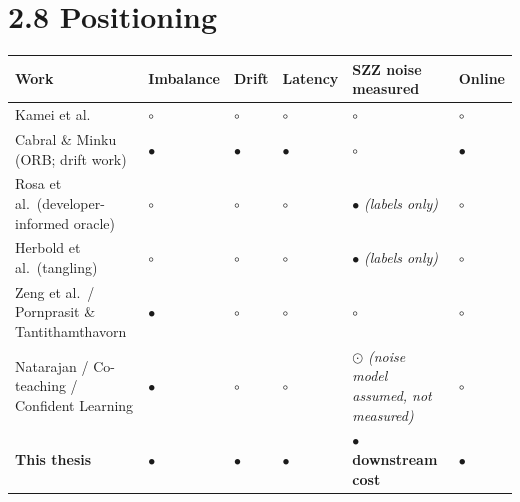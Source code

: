 \section{2.8 Positioning}\label{positioning}

\begin{longtable}[]{@{}
  >{\raggedright\arraybackslash}p{}
  >{\raggedright\arraybackslash}p{}
  >{\raggedright\arraybackslash}p{}
  >{\raggedright\arraybackslash}p{}
  >{\raggedright\arraybackslash}p{}
  >{\raggedright\arraybackslash}p{}@{}}
\toprule\noalign{}
\begin{minipage}[b]{\linewidth}\raggedright
Work
\end{minipage} & \begin{minipage}[b]{\linewidth}\raggedright
Imbalance
\end{minipage} & \begin{minipage}[b]{\linewidth}\raggedright
Drift
\end{minipage} & \begin{minipage}[b]{\linewidth}\raggedright
Latency
\end{minipage} & \begin{minipage}[b]{\linewidth}\raggedright
SZZ noise \textbf{measured}
\end{minipage} & \begin{minipage}[b]{\linewidth}\raggedright
Online
\end{minipage} \\
\midrule\noalign{}
\endhead
\bottomrule\noalign{}
\endlastfoot
Kamei et al. & \ensuremath{\circ} & \ensuremath{\circ} & \ensuremath{\circ} & \ensuremath{\circ} & \ensuremath{\circ} \\
Cabral \& Minku (ORB; drift work) & \ensuremath{\bullet} & \ensuremath{\bullet} & \ensuremath{\bullet} & \ensuremath{\circ} & \ensuremath{\bullet} \\
Rosa et al.~(developer-informed oracle) & \ensuremath{\circ} & \ensuremath{\circ} & \ensuremath{\circ} & \ensuremath{\bullet} \emph{(labels
only)} & \ensuremath{\circ} \\
Herbold et al.~(tangling) & \ensuremath{\circ} & \ensuremath{\circ} & \ensuremath{\circ} & \ensuremath{\bullet} \emph{(labels only)} & \ensuremath{\circ} \\
Zeng et al.~/ Pornprasit \& Tantithamthavorn & \ensuremath{\bullet} & \ensuremath{\circ} & \ensuremath{\circ} & \ensuremath{\circ} & \ensuremath{\circ} \\
Natarajan / Co-teaching / Confident Learning & \ensuremath{\bullet} & \ensuremath{\circ} & \ensuremath{\circ} & \ensuremath{\odot}
\emph{(noise model assumed, not measured)} & \ensuremath{\circ} \\
\textbf{This thesis} & \ensuremath{\bullet} & \ensuremath{\bullet} & \ensuremath{\bullet} & \ensuremath{\bullet} \textbf{downstream cost} & \ensuremath{\bullet} \\
\end{longtable}

